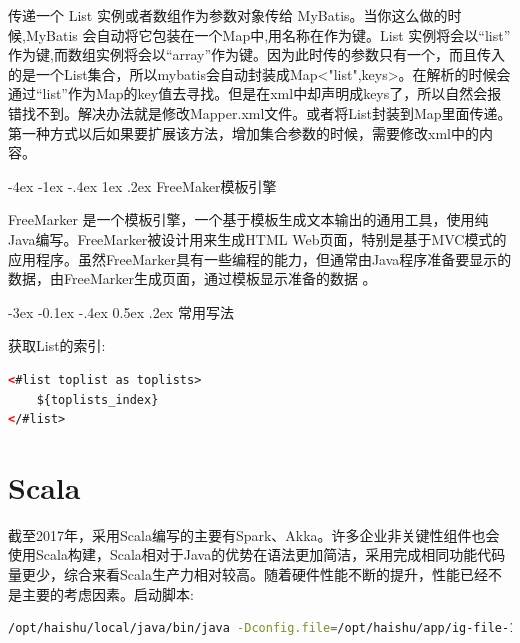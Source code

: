 \documentclass[12pt]{book}
\makeatletter
\numberwithin{dummy}{section}
\theoremstyle{ocrenumbox}
\theoremstyle{blacknumex}
\theoremstyle{blacknumbox}
\theoremstyle{ocrenum}
\renewcommand{\section}{\@startsection{section}{1}{\z@}
	{-4ex \@plus -1ex \@minus -.4ex}
	{1ex \@plus.2ex }
	{\normalfont\large\sffamily\bfseries}}
\renewcommand{\subsection}{\@startsection {subsection}{2}{\z@}
	{-3ex \@plus -0.1ex \@minus -.4ex}
	{0.5ex \@plus.2ex }
	{\normalfont\sffamily\bfseries}}
\makeatother
\begin{document}
传递一个 List 实例或者数组作为参数对象传给 MyBatis。当你这么做的时 候,MyBatis 会自动将它包装在一个Map中,用名称在作为键。List 实例将会以“list” 作为键,而数组实例将会以“array”作为键。因为此时传的参数只有一个，而且传入的是一个List集合，所以mybatis会自动封装成Map<"list",keys>。在解析的时候会通过“list”作为Map的key值去寻找。但是在xml中却声明成keys了，所以自然会报错找不到。解决办法就是修改Mapper.xml文件。或者将List封装到Map里面传递。第一种方式以后如果要扩展该方法，增加集合参数的时候，需要修改xml中的内容。

\newpage

\section{FreeMaker模板引擎}

FreeMarker 是一个模板引擎，一个基于模板生成文本输出的通用工具，使用纯Java编写。FreeMarker被设计用来生成HTML Web页面，特别是基于MVC模式的应用程序。虽然FreeMarker具有一些编程的能力，但通常由Java程序准备要显示的数据，由FreeMarker生成页面，通过模板显示准备的数据 。

\subsection{常用写法}

获取List的索引:

\begin{lstlisting}[language=HTML]
<#list toplist as toplists>
	${toplists_index}
</#list>
\end{lstlisting}


\chapter{Scala}

截至2017年，采用Scala编写的主要有Spark、Akka。许多企业非关键性组件也会使用Scala构建，Scala相对于Java的优势在语法更加简洁，采用完成相同功能代码量更少，综合来看Scala生产力相对较高。随着硬件性能不断的提升，性能已经不是主要的考虑因素。启动脚本:


\begin{lstlisting}[language=Bash]
/opt/haishu/local/java/bin/java -Dconfig.file=/opt/haishu/app/ig-file-1.0.0/bin/../conf/application.conf -Dpidfile.path=/opt/haishu/app/ig-file-1.0.0/bin/../run/ig-file.pid -Dlogback.configurationFile=/opt/haishu/app/ig-file-1.0.0/bin/../conf/logback.xml -cp /opt/haishu/app/ig-file-1.0.0/lib/* intelligence.fileserver.boot.FileBoot -Xms2G -Xmx4G
\end{lstlisting}
\end{document}

